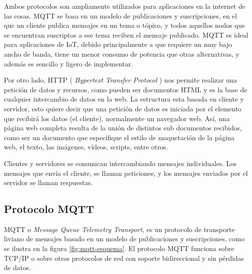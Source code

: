Ambos protocolos son ampliamente utilizados para aplicaciones en la internet de las cosas.  MQTT se basa en un modelo de publicaciones y suscripciones, en el que un cliente publica mensajes en un tema o tópico, y todos aquellos nodos que se encuentran suscriptos a ese tema reciben el mensaje publicado. MQTT es ideal para aplicaciones de IoT, debido principalmente a que requiere un muy bajo ancho de banda, tiene un menor consumo de potencia que otras alternativas, y además es sencillo y ligero de implementar. 

Por otro lado, HTTP \citep{WEBSITE:14} (\textit{ Hypertext Transfer Protocol} ) nos permite realizar una petición de datos y recursos, como pueden ser documentos HTML \citep{BOOK:2} y es la base de cualquier intercambio de datos en la web. La estructura esta basada en cliente y servidor, esto quiere decir que una petición de datos es iniciada por el elemento que recibirá los datos (el cliente), normalmente un navegador web.   Así,  una página web completa resulta de la unión de distintos sub documentos recibidos, como ser un documento que especifique el estilo de maquetación de la página web, el texto, las imágenes, vídeos, scripts, entre otros. 

Clientes y servidores se comunican intercambiando mensajes individuales. Los mensajes que envía el cliente, se llaman peticiones, y los mensajes enviados por el servidor se llaman respuestas.


\subsection{Protocolo MQTT}

MQTT o \textit{ Message Queue Telemetry Transport}, es un protocolo de transporte liviano de mensajes basado en un modelo de publicaciones y suscripciones, como se ilustra en la figura \ref{fig:mqtt-esquema}. El protocolo MQTT funciona sobre TCP/IP o sobre otros protocolos de red con soporte bidireccional y sin pérdidas de datos.

